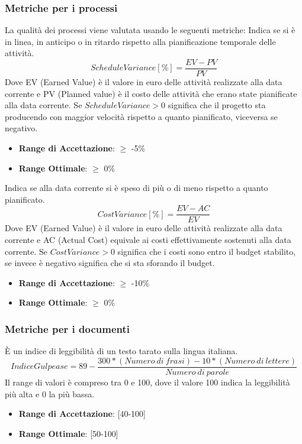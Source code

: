 \documentclass[12pt,a4paper]{article}
\begin{document}
\subsubsection{Metriche per i processi}\label{metriche_processi}
La qualità dei processi viene valutata usando le seguenti metriche:
Indica se si è in linea, in anticipo o in ritardo rispetto alla pianificazione temporale delle attività.
\[ScheduleVariance [\%] = \frac{EV - PV}{PV}\]
Dove EV (Earned Value) è il valore in euro delle attività realizzate alla data corrente e PV (Planned value) è il costo delle attività che erano state pianificate alla data corrente.
Se $ScheduleVariance > 0$ significa che il progetto sta producendo con maggior velocità rispetto a quanto pianificato, viceversa se negativo.
\begin{itemize}
\item \textbf{Range di Accettazione}: $\geq$ -5\%
\item \textbf{Range Ottimale}: $\geq$ 0\%
\end{itemize}
Indica se alla data corrente si è speso di più o di meno rispetto a quanto pianificato.
\[CostVariance [\%] = \frac{EV - AC}{EV}\]
Dove EV (Earned Value) è il valore in euro delle attività realizzate alla data corrente e AC (Actual Cost) equivale ai costi effettivamente sostenuti alla data corrente.
Se $CostVariance > 0$ significa che i costi sono entro il budget stabilito, se invece è negativo significa che si sta sforando il budget.
\begin{itemize}
\item \textbf{Range di Accettazione}: $\geq$ -10\%
\item \textbf{Range Ottimale}: $\geq$ 0\%
\end{itemize}
\subsubsection{Metriche per i documenti}\label{metriche_doc}
È un indice di leggibilità di un testo tarato sulla lingua italiana.
\[IndiceGulpease=89-\frac{300*(Numero\ di\ frasi)-10*(Numero\ di\ lettere)}{Numero\ di\ parole}\]
Il range di valori è compreso tra 0 e 100, dove il valore 100 indica la leggibilità più alta e 0 la più bassa.
\begin{itemize}
\item \textbf{Range di Accettazione}: [40-100]
\item \textbf{Range Ottimale}: [50-100]
\end{itemize}
\end{document}
